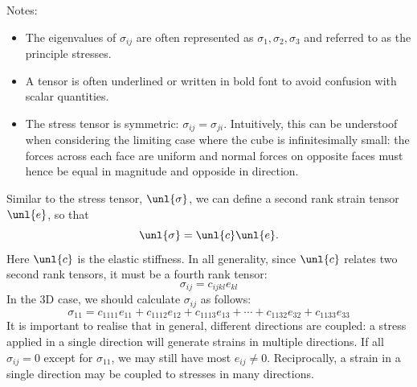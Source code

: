 \documentclass[a4paper, 11pt, normalem]{report}
\begin{document}
\begin{example}
\begin{multicols}{2}
\end{multicols}
Notes:
\begin{itemize}
    \item The eigenvalues of $\sigma_{ij}$ are often represented as $\sigma_1,\sigma_2,\sigma_3$ and referred to as the principle stresses.
    \item A tensor is often underlined or written in bold font to avoid confusion with scalar quantities.
    \item The stress tensor is symmetric: $\sigma_{ij} = \sigma_{ji}$.
        Intuitively, this can be understoof when considering the limiting case where the cube is infinitesimally small: the forces across each face are uniform and normal forces on opposite faces must hence be equal in magnitude and opposide in direction.
\end{itemize}
\end{example}
Similar to the stress tensor, $\unl{\sigma}$, we can define a second rank strain tensor $\unl{e}$, so that
\begin{equation}
    \unl{\sigma} = \unl{c}\unl{e}.
\end{equation}
Here $\unl{c}$ is the elastic stiffness.
In all generality, since $\unl{c}$ relates two second rank tensors, it must be a fourth rank tensor:
\begin{equation}
    \sigma_{ij} = c_{ijkl}e_{kl}
\end{equation}
In the 3D case, we should calculate $\sigma_{ij}$ as follows:
\begin{equation}
    \sigma_{11} = c_{1111}e_{11} + c_{1112}e_{12} + c_{1113}e_{13} + \cdots + c_{1132}e_{32} + c_{1133}e_{33}
\end{equation}
It is important to realise that in general, different directions are coupled: a stress applied in a single direction will generate strains in multiple directions.
If all $\sigma_{ij} = 0$ except for $\sigma_{11}$, we may still have most $e_{ij}\neq0$.
Reciprocally, a strain in a single direction may be coupled to stresses in many directions.
\begin{figure}[H]
    \centering
\end{figure}
\end{document}

